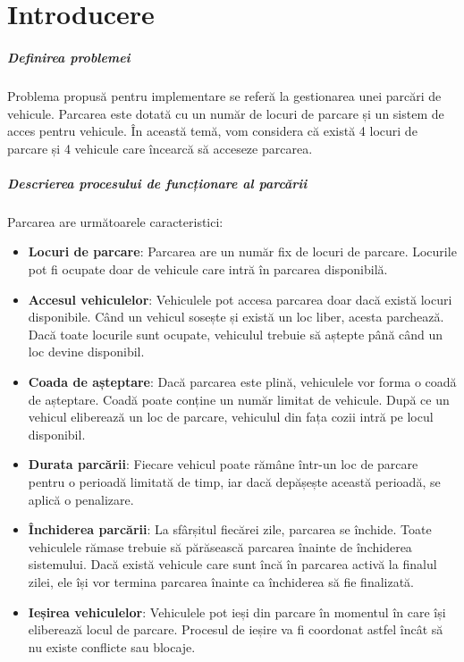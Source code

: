 \documentclass[a4paper,11pt]{report}
\begin{document}

 \setcounter{tocdepth}{2}
 \tableofcontents
 \clearpage

\setlength{\parskip}{1em} 


\chapter{Introducere}\label{chap:intro}


\paragraph{Definirea problemei}

Problema propusă pentru implementare se referă la gestionarea unei parcări de vehicule. Parcarea este dotată cu un număr de locuri de parcare și un sistem de acces pentru vehicule. În această temă, vom considera că există 4 locuri de parcare și 4 vehicule care încearcă să acceseze parcarea.

\paragraph{Descrierea procesului de funcționare al parcării}

Parcarea are următoarele caracteristici:

\begin{itemize} \item \textbf{Locuri de parcare}: Parcarea are un număr fix de locuri de parcare. Locurile pot fi ocupate doar de vehicule care intră în parcarea disponibilă. \item \textbf{Accesul vehiculelor}: Vehiculele pot accesa parcarea doar dacă există locuri disponibile. Când un vehicul sosește și există un loc liber, acesta parchează. Dacă toate locurile sunt ocupate, vehiculul trebuie să aștepte până când un loc devine disponibil. \item \textbf{Coada de așteptare}: Dacă parcarea este plină, vehiculele vor forma o coadă de așteptare. Coadă poate conține un număr limitat de vehicule. După ce un vehicul eliberează un loc de parcare, vehiculul din fața cozii intră pe locul disponibil. \item \textbf{Durata parcării}: Fiecare vehicul poate rămâne într-un loc de parcare pentru o perioadă limitată de timp, iar dacă depășește această perioadă, se aplică o penalizare. \item \textbf{Închiderea parcării}: La sfârșitul fiecărei zile, parcarea se închide. Toate vehiculele rămase trebuie să părăsească parcarea înainte de închiderea sistemului. Dacă există vehicule care sunt încă în parcarea activă la finalul zilei, ele își vor termina parcarea înainte ca închiderea să fie finalizată. \item \textbf{Ieșirea vehiculelor}: Vehiculele pot ieși din parcare în momentul în care își eliberează locul de parcare. Procesul de ieșire va fi coordonat astfel încât să nu existe conflicte sau blocaje. \end{itemize}
\end{document}
